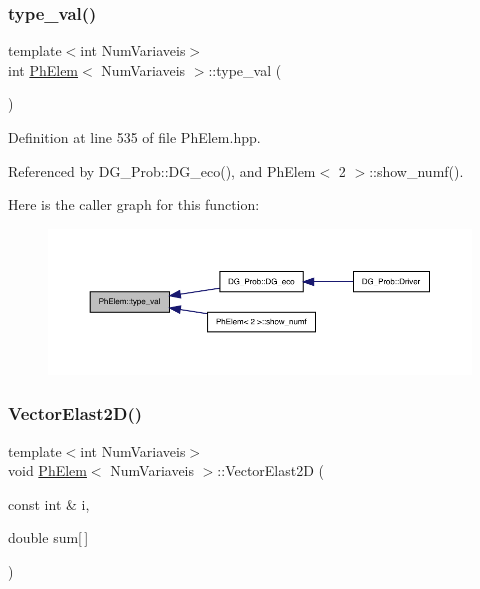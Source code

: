 \subsubsection{\texorpdfstring{type\+\_\+val()}{type\_val()}}
{\footnotesize\ttfamily template$<$int Num\+Variaveis$>$ \\
int \hyperlink{classPhElem}{Ph\+Elem}$<$ Num\+Variaveis $>$\+::type\+\_\+val (\begin{DoxyParamCaption}{ }\end{DoxyParamCaption})}



Definition at line 535 of file Ph\+Elem.\+hpp.



Referenced by D\+G\+\_\+\+Prob\+::\+D\+G\+\_\+eco(), and Ph\+Elem$<$ 2 $>$\+::show\+\_\+numf().

Here is the caller graph for this function\+:
\nopagebreak
\begin{figure}[H]
\begin{center}
\leavevmode
\includegraphics[width=350pt]{classPhElem_a4ea6c54e35eb46d331db770f992c4c4b_icgraph}
\end{center}
\end{figure}
\mbox{\label{classPhElem_a38499c9f62a291a880d72db646171cb5}} 
\subsubsection{\texorpdfstring{Vector\+Elast2\+D()}{VectorElast2D()}\hspace{0.1cm}{\footnotesize\ttfamily [1/2]}}
{\footnotesize\ttfamily template$<$int Num\+Variaveis$>$ \\
void \hyperlink{classPhElem}{Ph\+Elem}$<$ Num\+Variaveis $>$\+::Vector\+Elast2D (\begin{DoxyParamCaption}\item[{const int \&}]{i,  }\item[{double}]{sum\mbox{[}$\,$\mbox{]} }\end{DoxyParamCaption})}



